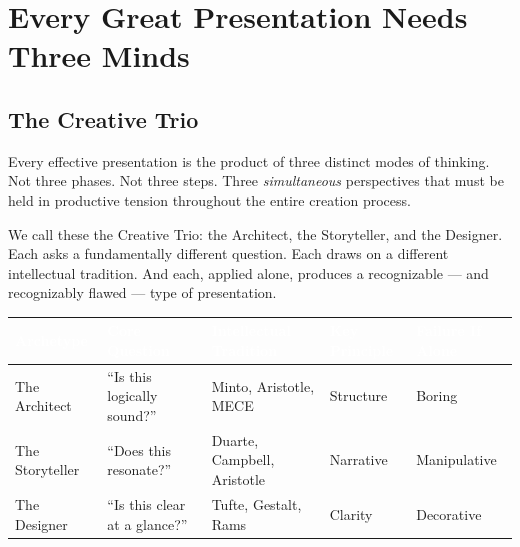 
\section{Every Great Presentation Needs Three Minds}



\subsection{The Creative Trio}

Every effective presentation is the product of three distinct modes of thinking. Not three phases. Not three steps. Three \emph{simultaneous} perspectives that must be held in productive tension throughout the entire creation process.

We call these the Creative Trio: the Architect, the Storyteller, and the Designer. Each asks a fundamentally different question. Each draws on a different intellectual tradition. And each, applied alone, produces a recognizable --- and recognizably flawed --- type of presentation.

\begin{center}
\begin{tabularx}{\textwidth}{>{\raggedright}p{2.5cm} >{\raggedright}p{3cm} >{\raggedright}p{3.5cm} >{\raggedright}p{2.5cm} >{\raggedright\arraybackslash}p{2cm}}
\toprule
\rowcolor{tableheader} \textcolor{white}{\textbf{Archetype}} & \textcolor{white}{\textbf{Core Question}} & \textcolor{white}{\textbf{Intellectual Tradition}} & \textcolor{white}{\textbf{Key Principle}} & \textcolor{white}{\textbf{Failure If Alone}} \\
\midrule
The Architect & ``Is this logically sound?'' & Minto, Aristotle, MECE & Structure & Boring \\
\rowcolor{altrow}
The Storyteller & ``Does this resonate?'' & Duarte, Campbell, Aristotle & Narrative & Manipulative \\
The Designer & ``Is this clear at a glance?'' & Tufte, Gestalt, Rams & Clarity & Decorative \\
\bottomrule
\end{tabularx}
\end{center}


